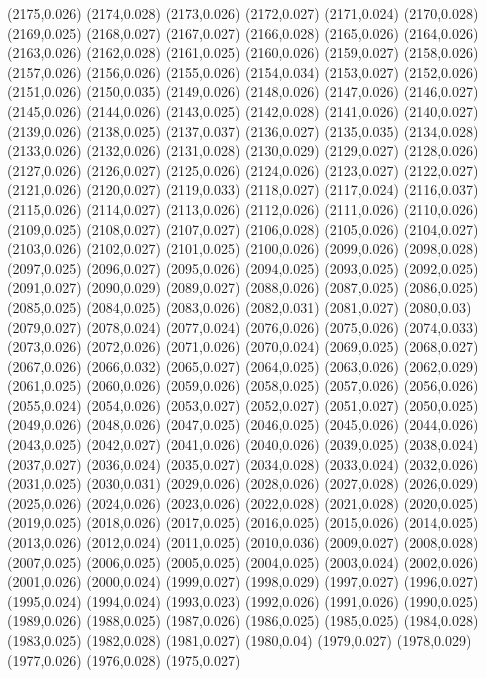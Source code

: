 (2175,0.026)
(2174,0.028)
(2173,0.026)
(2172,0.027)
(2171,0.024)
(2170,0.028)
(2169,0.025)
(2168,0.027)
(2167,0.027)
(2166,0.028)
(2165,0.026)
(2164,0.026)
(2163,0.026)
(2162,0.028)
(2161,0.025)
(2160,0.026)
(2159,0.027)
(2158,0.026)
(2157,0.026)
(2156,0.026)
(2155,0.026)
(2154,0.034)
(2153,0.027)
(2152,0.026)
(2151,0.026)
(2150,0.035)
(2149,0.026)
(2148,0.026)
(2147,0.026)
(2146,0.027)
(2145,0.026)
(2144,0.026)
(2143,0.025)
(2142,0.028)
(2141,0.026)
(2140,0.027)
(2139,0.026)
(2138,0.025)
(2137,0.037)
(2136,0.027)
(2135,0.035)
(2134,0.028)
(2133,0.026)
(2132,0.026)
(2131,0.028)
(2130,0.029)
(2129,0.027)
(2128,0.026)
(2127,0.026)
(2126,0.027)
(2125,0.026)
(2124,0.026)
(2123,0.027)
(2122,0.027)
(2121,0.026)
(2120,0.027)
(2119,0.033)
(2118,0.027)
(2117,0.024)
(2116,0.037)
(2115,0.026)
(2114,0.027)
(2113,0.026)
(2112,0.026)
(2111,0.026)
(2110,0.026)
(2109,0.025)
(2108,0.027)
(2107,0.027)
(2106,0.028)
(2105,0.026)
(2104,0.027)
(2103,0.026)
(2102,0.027)
(2101,0.025)
(2100,0.026)
(2099,0.026)
(2098,0.028)
(2097,0.025)
(2096,0.027)
(2095,0.026)
(2094,0.025)
(2093,0.025)
(2092,0.025)
(2091,0.027)
(2090,0.029)
(2089,0.027)
(2088,0.026)
(2087,0.025)
(2086,0.025)
(2085,0.025)
(2084,0.025)
(2083,0.026)
(2082,0.031)
(2081,0.027)
(2080,0.03)
(2079,0.027)
(2078,0.024)
(2077,0.024)
(2076,0.026)
(2075,0.026)
(2074,0.033)
(2073,0.026)
(2072,0.026)
(2071,0.026)
(2070,0.024)
(2069,0.025)
(2068,0.027)
(2067,0.026)
(2066,0.032)
(2065,0.027)
(2064,0.025)
(2063,0.026)
(2062,0.029)
(2061,0.025)
(2060,0.026)
(2059,0.026)
(2058,0.025)
(2057,0.026)
(2056,0.026)
(2055,0.024)
(2054,0.026)
(2053,0.027)
(2052,0.027)
(2051,0.027)
(2050,0.025)
(2049,0.026)
(2048,0.026)
(2047,0.025)
(2046,0.025)
(2045,0.026)
(2044,0.026)
(2043,0.025)
(2042,0.027)
(2041,0.026)
(2040,0.026)
(2039,0.025)
(2038,0.024)
(2037,0.027)
(2036,0.024)
(2035,0.027)
(2034,0.028)
(2033,0.024)
(2032,0.026)
(2031,0.025)
(2030,0.031)
(2029,0.026)
(2028,0.026)
(2027,0.028)
(2026,0.029)
(2025,0.026)
(2024,0.026)
(2023,0.026)
(2022,0.028)
(2021,0.028)
(2020,0.025)
(2019,0.025)
(2018,0.026)
(2017,0.025)
(2016,0.025)
(2015,0.026)
(2014,0.025)
(2013,0.026)
(2012,0.024)
(2011,0.025)
(2010,0.036)
(2009,0.027)
(2008,0.028)
(2007,0.025)
(2006,0.025)
(2005,0.025)
(2004,0.025)
(2003,0.024)
(2002,0.026)
(2001,0.026)
(2000,0.024)
(1999,0.027)
(1998,0.029)
(1997,0.027)
(1996,0.027)
(1995,0.024)
(1994,0.024)
(1993,0.023)
(1992,0.026)
(1991,0.026)
(1990,0.025)
(1989,0.026)
(1988,0.025)
(1987,0.026)
(1986,0.025)
(1985,0.025)
(1984,0.028)
(1983,0.025)
(1982,0.028)
(1981,0.027)
(1980,0.04)
(1979,0.027)
(1978,0.029)
(1977,0.026)
(1976,0.028)
(1975,0.027)
